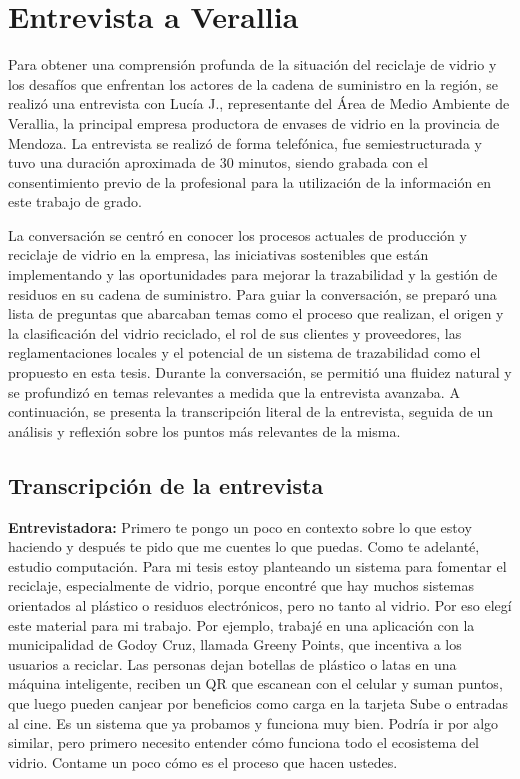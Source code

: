 \chapter{Entrevista a Verallia}
\label{cp:verallia-interview}

\parindent0pt

Para obtener una comprensión profunda de la situación del reciclaje de vidrio y los desafíos que enfrentan los actores de la cadena de suministro en la región, se realizó una entrevista con Lucía J., representante del Área de Medio Ambiente de Verallia, la principal empresa productora de envases de vidrio en la provincia de Mendoza. La entrevista se realizó de forma telefónica, fue semiestructurada y tuvo una duración aproximada de 30 minutos, siendo grabada con el consentimiento previo de la profesional para la utilización de la información en este trabajo de grado.

La conversación se centró en conocer los procesos actuales de producción y reciclaje de vidrio en la empresa, las iniciativas sostenibles que están implementando y las oportunidades para mejorar la trazabilidad y la gestión de residuos en su cadena de suministro. Para guiar la conversación, se preparó una lista de preguntas que abarcaban temas como el proceso que realizan, el origen y la clasificación del vidrio reciclado, el rol de sus clientes y proveedores, las reglamentaciones locales y el potencial de un sistema de trazabilidad como el propuesto en esta tesis. Durante la conversación, se permitió una fluidez natural y se profundizó en temas relevantes a medida que la entrevista avanzaba. A continuación, se presenta la transcripción literal de la entrevista, seguida de un análisis y reflexión sobre los puntos más relevantes de la misma.

\section{Transcripción de la entrevista}

\textbf{Entrevistadora:} Primero te pongo un poco en contexto sobre lo que estoy haciendo y después te pido que me cuentes lo que puedas. Como te adelanté, estudio computación. Para mi tesis estoy planteando un sistema para fomentar el reciclaje, especialmente de vidrio, porque encontré que hay muchos sistemas orientados al plástico o residuos electrónicos, pero no tanto al vidrio. Por eso elegí este material para mi trabajo. Por ejemplo, trabajé en una aplicación con la municipalidad de Godoy Cruz, llamada Greeny Points, que incentiva a los usuarios a reciclar. Las personas dejan botellas de plástico o latas en una máquina inteligente, reciben un QR que escanean con el celular y suman puntos, que luego pueden canjear por beneficios como carga en la tarjeta Sube o entradas al cine. Es un sistema que ya probamos y funciona muy bien. Podría ir por algo similar, pero primero necesito entender cómo funciona todo el ecosistema del vidrio. Contame un poco cómo es el proceso que hacen ustedes.

